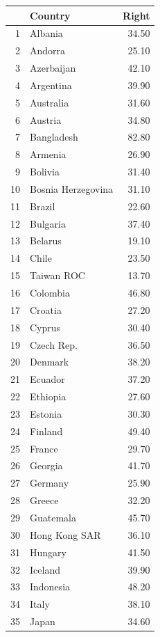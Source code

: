 \documentclass{amsart}
\begin{document}
\begin{table}[ht]
\centering
\begin{tabular}{rlr}
  \hline
 & Country & Right \\ 
  \hline
1 & Albania & 34.50 \\ 
  2 & Andorra & 25.10 \\ 
  3 & Azerbaijan & 42.10 \\ 
  4 & Argentina & 39.90 \\ 
  5 & Australia & 31.60 \\ 
  6 & Austria & 34.80 \\ 
  7 & Bangladesh & 82.80 \\ 
  8 & Armenia & 26.90 \\ 
  9 & Bolivia & 31.40 \\ 
  10 & Bosnia Herzegovina & 31.10 \\ 
  11 & Brazil & 22.60 \\ 
  12 & Bulgaria & 37.40 \\ 
  13 & Belarus & 19.10 \\ 
  14 & Chile & 23.50 \\ 
  15 & Taiwan ROC & 13.70 \\ 
  16 & Colombia & 46.80 \\ 
  17 & Croatia & 27.20 \\ 
  18 & Cyprus & 30.40 \\ 
  19 & Czech Rep. & 36.50 \\ 
  20 & Denmark & 38.20 \\ 
  21 & Ecuador & 37.20 \\ 
  22 & Ethiopia & 27.60 \\ 
  23 & Estonia & 30.30 \\ 
  24 & Finland & 49.40 \\ 
  25 & France & 29.70 \\ 
  26 & Georgia & 41.70 \\ 
  27 & Germany & 25.90 \\ 
  28 & Greece & 32.20 \\ 
  29 & Guatemala & 45.70 \\ 
  30 & Hong Kong SAR & 36.10 \\ 
  31 & Hungary & 41.50 \\ 
  32 & Iceland & 39.90 \\ 
  33 & Indonesia & 48.20 \\ 
  34 & Italy & 38.10 \\ 
  35 & Japan & 34.60 \\ 

\end{tabular}
\end{table}
\end{document}
